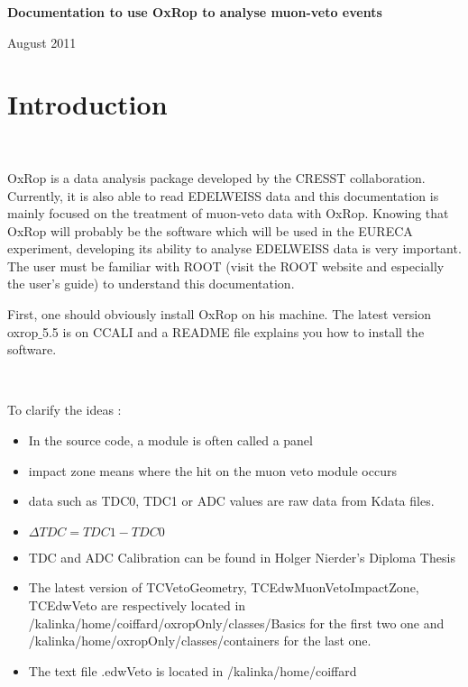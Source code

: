 \documentclass[12pt, a4paper]{article}
\begin{document}
\begin{titlepage}
\hfill
\begin{center}
\Huge
\textbf{Documentation to use OxRop to analyse muon-veto events}   
\end{center}       

\vfill

\Large{August 2011}

\vfill



\end{titlepage}


\newpage


\section{Introduction}

~

OxRop is a data analysis package developed by the CRESST collaboration. Currently, it is also able to read EDELWEISS data and this documentation is mainly focused on the treatment of muon-veto data with OxRop. Knowing that OxRop will probably be the software which will be used in the EURECA experiment, developing its ability to analyse EDELWEISS data is very important. The user must be familiar with ROOT (visit the ROOT website and especially the user's guide) to understand this documentation. 

First, one should obviously install OxRop on his machine. The latest version oxrop$\_$5.5 is on CCALI and a README file explains you how to install the software.

~
~

To clarify the ideas : 
\begin{itemize}
\item In the source code, a module is often called a panel

\item impact zone means where the hit on the muon veto module occurs

\item data such as TDC0, TDC1 or ADC values are raw data from Kdata files.

\item $ \Delta TDC = TDC1 - TDC0 $

\item TDC and ADC Calibration can be found in Holger Nierder's Diploma Thesis

\item The latest version of TCVetoGeometry, TCEdwMuonVetoImpactZone, TCEdwVeto are respectively located in /kalinka/home/coiffard/oxropOnly/classes/Basics for the first two one and /kalinka/home/oxropOnly/classes/containers for the last one. 

\item The text file .edwVeto is located in /kalinka/home/coiffard
\end{itemize}
\end{document}
